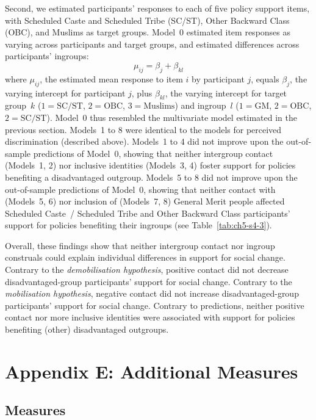 \documentclass[12pt, a4paper]{article}
\begin{document}
Second, we estimated participants' responses to each of five policy support items, with Scheduled Caste and Scheduled Tribe (SC/ST), Other Backward Class (OBC), and Muslims as target groups. Model~0 estimated item responses as varying across participants and target groups, and estimated differences across participants' ingroups: $$ \mu_{ij} = \beta_{j} + \beta_{kl} $$ where $\mu_{ij}$, the estimated mean response to item $i$ by participant $j$, equals $\beta_j$, the varying intercept for participant $j$, plus $\beta_{kl}$, the varying intercept for target group~$k$ ($1 = \text{SC/ST}$, $2 = \text{OBC}$, $3 = \text{Muslims}$) and ingroup~$l$ ($1 = \text{GM}$, $2 = \text{OBC}$, $2 = \text{SC/ST}$). Model~0 thus resembled the multivariate model estimated in the previous section. Models~1 to 8 were identical to the models for perceived discrimination (described above). Models~1 to 4 did not improve upon the out-of-sample predictions of Model~0, showing that neither intergroup contact (Models~1, 2) nor inclusive identities (Models~3, 4) foster support for policies benefiting a disadvantaged outgroup.  Models~5 to 8 did not improve upon the out-of-sample predictions of Model~0, showing that neither contact with (Models~5, 6) nor inclusion of (Models~7, 8) General Merit people affected Scheduled Caste~/ Scheduled Tribe and Other Backward Class participants' support for policies benefiting their ingroups (see Table~\ref{tab:ch5-s4-3}).

Overall, these findings show that neither intergroup contact nor ingroup construals could explain individual differences in support for social change. Contrary to the \emph{demobilisation hypothesis}, positive contact did not decrease disadvantaged-group participants' support for social change. Contrary to the \emph{mobilisation hypothesis}, negative contact did not increase disadvantaged-group participants' support for social change. Contrary to predictions, neither positive contact nor more inclusive identities were associated with support for policies benefiting (other) disadvantaged outgroups.

\section{Appendix E: Additional Measures}

\subsection{Measures}
\end{document}
